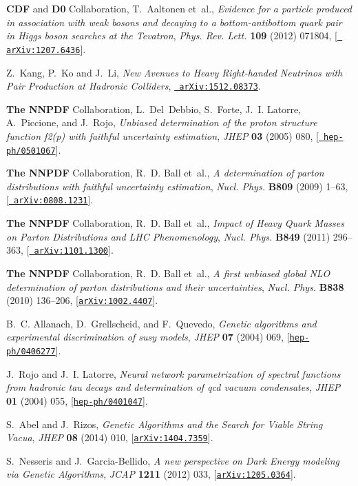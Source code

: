 \documentclass[a4paper,11pt]{article}
\begin{document}
\begin{thebibliography}{100}
  {\bf CDF} and {\bf D0}
  Collaboration, T.~Aaltonen et~al., {\it {Evidence for a particle
  produced in association with weak bosons and decaying to a bottom-antibottom
  quark pair in Higgs boson searches at the Tevatron}},  {\em Phys. Rev. Lett.}
  {\bf 109} (2012) 071804, [\href{http://arxiv.org/abs/1207.6436}{{\tt
        arXiv:1207.6436}}].

  Z.~Kang, P.~Ko and J.~Li,
  {\it New Avenues to Heavy Right-handed Neutrinos with Pair Production at Hadronic Colliders},
   \href{http://arxiv.org/abs/1512.08373}{{\tt
       arXiv:1512.08373}}.
   

{\bf The NNPDF} Collaboration, L.~Del~Debbio, S.~Forte, J.~I. Latorre,
  A.~Piccione, and J.~Rojo, {\it Unbiased determination of the proton structure
  function f2(p) with faithful uncertainty estimation},  {\em JHEP} {\bf 03}
  (2005) 080, [\href{http://arxiv.org/abs/hep-ph/0501067}{{\tt
  hep-ph/0501067}}].

{\bf The NNPDF} Collaboration, R.~D. Ball et~al., {\it {A determination of
  parton distributions with faithful uncertainty estimation}},  {\em Nucl.
  Phys.} {\bf B809} (2009) 1--63, [\href{http://arxiv.org/abs/0808.1231}{{\tt
  arXiv:0808.1231}}].

{\bf The NNPDF} Collaboration, R.~D. Ball et~al., {\it {Impact of Heavy Quark
  Masses on Parton Distributions and LHC Phenomenology}},  {\em Nucl. Phys.}
  {\bf B849} (2011) 296--363, [\href{http://arxiv.org/abs/1101.1300}{{\tt
  arXiv:1101.1300}}].

{\bf {The NNPDF}} Collaboration, R.~D. Ball et~al., {\it {A first unbiased
  global NLO determination of parton distributions and their uncertainties}},
  {\em Nucl. Phys.} {\bf B838} (2010) 136--206,
  [\href{http://arxiv.org/abs/1002.4407}{{\tt arXiv:1002.4407}}].

B.~C. Allanach, D.~Grellscheid, and F.~Quevedo, {\it Genetic algorithms and
  experimental discrimination of susy models},  {\em JHEP} {\bf 07} (2004) 069,
  [\href{http://arxiv.org/abs/hep-ph/0406277}{{\tt hep-ph/0406277}}].

J.~Rojo and J.~I. Latorre, {\it Neural network parametrization of spectral
  functions from hadronic tau decays and determination of qcd vacuum
  condensates},  {\em JHEP} {\bf 01} (2004) 055,
  [\href{http://arxiv.org/abs/hep-ph/0401047}{{\tt hep-ph/0401047}}].

S.~Abel and J.~Rizos, {\it {Genetic Algorithms and the Search for Viable String
  Vacua}},  {\em JHEP} {\bf 08} (2014) 010,
  [\href{http://arxiv.org/abs/1404.7359}{{\tt arXiv:1404.7359}}].

S.~Nesseris and J.~Garcia-Bellido, {\it {A new perspective on Dark Energy
  modeling via Genetic Algorithms}},  {\em JCAP} {\bf 1211} (2012) 033,
  [\href{http://arxiv.org/abs/1205.0364}{{\tt arXiv:1205.0364}}].

\end{thebibliography}\endgroup
\end{document}
